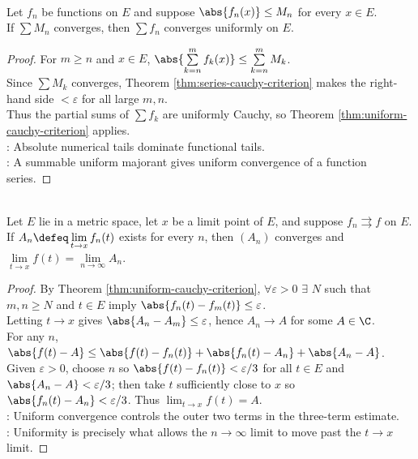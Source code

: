 \begin{theorem} \label{thm:weierstrass-m-test} \\
Let $f_n$ be functions on $E$ and suppose $\abs{f_n(x)}\leq M_n$ for every $x\in E$.\\
If $\sum M_n$ converges, then $\sum f_n$ converges uniformly on $E$.
\begin{proof}
For $m\geq n$ and $x\in E$, $\abs{\sum\limits_{k=n}^{m}f_k(x)}\leq\sum\limits_{k=n}^{m}M_k$.\\
Since $\sum M_k$ converges, Theorem \ref{thm:series-cauchy-criterion} makes the right-hand side $<\varepsilon$ for all large $m,n$.\\
Thus the partial sums of $\sum f_k$ are uniformly Cauchy, so Theorem \ref{thm:uniform-cauchy-criterion} applies.\\
: Absolute numerical tails dominate functional tails.\\
: A summable uniform majorant gives uniform convergence of a function series.
\end{proof}
\end{theorem}

\begin{theorem} \label{thm:uniform-convergence-interchanges-function-limits} \\
Let $E$ lie in a metric space, let $x$ be a limit point of $E$, and suppose $f_n\rightrightarrows f$ on $E$.\\
If $A_n\defeq \lim\limits_{t\to x}f_n(t)$ exists for every $n$, then $(A_n)$ converges and $\lim\limits_{t\to x} f(t)=\lim\limits_{n\to\infty}A_n$.
\begin{proof}
By Theorem \ref{thm:uniform-cauchy-criterion}, $\forall \varepsilon>0$ $\exists$ $N$ such that $m,n\geq N$ and $t\in E$ imply $\abs{f_n(t)-f_m(t)}\leq\varepsilon$.\\
Letting $t\to x$ gives $\abs{A_n-A_m}\leq\varepsilon$, hence $A_n\to A$ for some $A\in\C$.\\
For any $n$, $\abs{f(t)-A}\leq \abs{f(t)-f_n(t)}+\abs{f_n(t)-A_n}+\abs{A_n-A}$. Given $\varepsilon>0$, choose $n$ so $\abs{f(t)-f_n(t)}<\varepsilon/3$ for all $t\in E$ and $\abs{A_n-A}<\varepsilon/3$; then take $t$ sufficiently close to $x$ so $\abs{f_n(t)-A_n}<\varepsilon/3$. Thus $\lim_{t\to x}f(t)=A$.\\
: Uniform convergence controls the outer two terms in the three-term estimate.\\
: Uniformity is precisely what allows the $n\to\infty$ limit to move past the $t\to x$ limit.
\end{proof}
\end{theorem}

